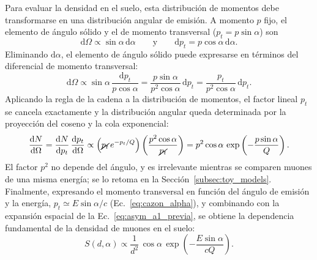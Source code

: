 Para evaluar la densidad en el suelo, esta distribución de momentos debe transformarse en una distribución angular de emisión. A momento $p$ fijo, el elemento de ángulo sólido y el de momento transversal ($p_t = p\sin\alpha$) son
\begin{equation}
	\mathrm{d}\Omega \propto \sin\alpha\,\mathrm{d}\alpha
	\qquad \text{y} \qquad
	\mathrm{d}p_t = p\cos\alpha\,\mathrm{d}\alpha .
	\nonumber
\end{equation}
Eliminando $\mathrm{d}\alpha$, el elemento de ángulo sólido puede expresarse en términos del diferencial de momento transversal:
\begin{equation}
	\mathrm{d}\Omega \propto \sin\alpha\,\frac{\mathrm{d}p_t}{p\cos\alpha} = \frac{p\sin\alpha}{p^2\cos\alpha}\,\mathrm{d}p_t = \frac{p_t}{p^2\cos\alpha}\,\mathrm{d}p_t .
	\nonumber
\end{equation}
Aplicando la regla de la cadena a la distribución de momentos, el factor lineal $p_t$ se cancela exactamente y la distribución angular queda determinada por la proyección del coseno y la cola exponencial:
\begin{equation}
	\frac{\mathrm{d}N}{\mathrm{d}\Omega} = \frac{\mathrm{d}N}{\mathrm{d}p_t}\,\frac{\mathrm{d}p_t}{\mathrm{d}\Omega} \propto \Big(\cancel{p_t}\, e^{-p_t/Q}\Big)\left(\frac{p^2\cos\alpha}{\cancel{p_t}}\right) = p^2 \cos\alpha\, \exp\left(-\frac{p\sin\alpha}{Q}\right) .
	\label{eq:cazon_dNdOmega}
\end{equation}
El factor $p^2$ no depende del ángulo, y es irrelevante mientras se comparen muones de una misma energía; se lo retoma en la Sección~\ref{subsec:toy_models}. Finalmente, expresando el momento transversal en función del ángulo de emisión y la energía, $p_t \simeq E\sin\alpha/c$ (Ec.~\ref{eq:cazon_alpha}), y combinando con la expansión espacial de la Ec.~\ref{eq:asym_a1_previa}, se obtiene la dependencia fundamental de la densidad de muones en el suelo:
\begin{equation}
	S(d, \alpha) \propto \frac{1}{d^2}\,\cos\alpha\,\exp\left(-\frac{E\sin\alpha}{cQ}\right).
	\label{eq:kinematic_divergence}
\end{equation}

